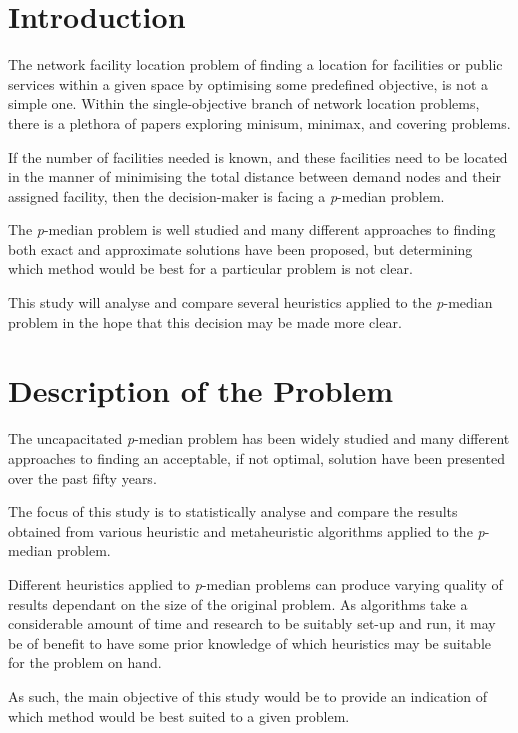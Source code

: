 \documentclass[11pt]{article}
\begin{document}
\setcounter{page}{1}		
	\section{Introduction} \label{introduction}
	The network facility location problem of finding a location for facilities or public services within a given space by optimising some predefined objective, is not a simple one.  Within the single-objective branch of network location problems, there is a plethora of papers exploring minisum, minimax, and covering problems.
	
	If the number of facilities needed is known, and these facilities need to be located in the manner of minimising the total distance between demand nodes and their assigned facility, then the decision-maker is facing a \emph{p}-median problem.
	
	The \emph{p}-median problem  is well studied and many different approaches to finding both exact and approximate solutions have been proposed, but determining which method would be best for a particular problem is not clear.
	
	This study will analyse and compare several heuristics applied to the \emph{p}-median problem in the hope that this decision may be made more clear.	
	
	
	\section{Description of the Problem} \label{problem.statement}
	The uncapacitated \emph{p}-median problem has been widely studied and many different approaches to finding an acceptable, if not optimal, solution have been presented over the past fifty years.
	
	The focus of this study is to statistically analyse and compare the results obtained from various heuristic and metaheuristic algorithms applied to the \emph{p}-median problem.
	
	Different heuristics applied to \emph{p}-median problems can produce varying quality of results dependant on the size of the original problem.  As algorithms take a considerable amount of time and research to be suitably set-up and run, it may be of benefit to have some prior knowledge of which heuristics may be suitable for the problem on hand.
	
	As such, the main objective of this study would be to provide an indication of which method would be best suited to a given problem.
	
\end{document}

